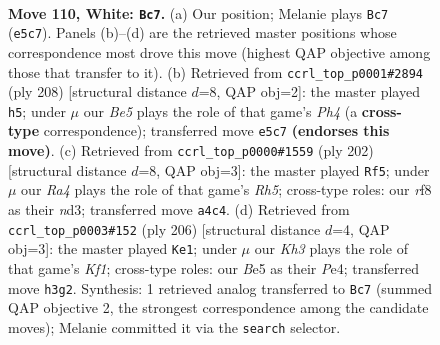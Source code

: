 \documentclass[11pt]{article}
\begin{document}
\clearpage

\begin{figure}[p]\centering
\begin{subfigure}{0.46\textwidth}\centering
\resizebox{\linewidth}{!}{%
\newchessgame
\chessboard[
  setfen={5r2/8/7k/4B3/R7/P6K/8/8 w - - 12 110},
  showmover=false,
  pgfstyle=straightmove, color=movearrow, markmove={e5-c7}
]}
\caption{}
\end{subfigure}\hfill
\begin{subfigure}{0.46\textwidth}\centering
\resizebox{\linewidth}{!}{%
\newchessgame
\chessboard[
  setfen={1R6/1P4k1/1r6/8/2K4P/8/8/8 w - - 21 105},
  showmover=false,
  pgfstyle=straightmove, color=movearrow, markmove={h4-h5}
]}
\caption{}
\end{subfigure}
\\[4pt]
\begin{subfigure}{0.46\textwidth}\centering
\resizebox{\linewidth}{!}{%
\newchessgame
\chessboard[
  setfen={8/5K2/k2B4/7R/7P/3n3P/8/8 w - - 1 102},
  showmover=false,
  pgfstyle=straightmove, color=movearrow, markmove={h5-f5}
]}
\caption{}
\end{subfigure}\hfill
\begin{subfigure}{0.46\textwidth}\centering
\resizebox{\linewidth}{!}{%
\newchessgame
\chessboard[
  setfen={8/8/8/R7/P3P3/6k1/3r4/5K2 w - - 0 104},
  showmover=false,
  pgfstyle=straightmove, color=movearrow, markmove={f1-e1}
]}
\caption{}
\end{subfigure}
\caption{\textbf{Move 110, White: \texttt{Bc7}.} (a) Our position; Melanie plays \texttt{Bc7} (\texttt{e5c7}). Panels (b)--(d) are the retrieved master positions whose correspondence most drove this move (highest QAP objective among those that transfer to it). (b) Retrieved from \texttt{ccrl\_top\_p0001\#2894} (ply 208) [structural distance $d$=8, QAP obj=2]: the master played \texttt{h5}; under $\mu$ our \emph{Be5} plays the role of that game's \emph{Ph4} (a \textbf{cross-type} correspondence); transferred move \texttt{e5c7} \textbf{(endorses this move)}. (c) Retrieved from \texttt{ccrl\_top\_p0000\#1559} (ply 202) [structural distance $d$=8, QAP obj=3]: the master played \texttt{Rf5}; under $\mu$ our \emph{Ra4} plays the role of that game's \emph{Rh5}; cross-type roles: our \emph{r}f8 as their \emph{n}d3; transferred move \texttt{a4c4}. (d) Retrieved from \texttt{ccrl\_top\_p0003\#152} (ply 206) [structural distance $d$=4, QAP obj=3]: the master played \texttt{Ke1}; under $\mu$ our \emph{Kh3} plays the role of that game's \emph{Kf1}; cross-type roles: our \emph{B}e5 as their \emph{P}e4; transferred move \texttt{h3g2}. Synthesis: 1 retrieved analog transferred to \texttt{Bc7} (summed QAP objective 2, the strongest correspondence among the candidate moves); Melanie committed it via the \texttt{search} selector.}
\label{fig:thought-m218}
\end{figure}
\end{document}
